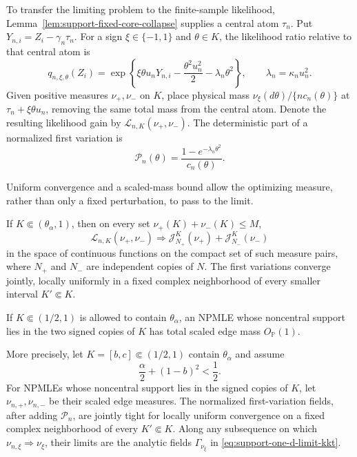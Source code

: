 To transfer the limiting problem to the finite-sample likelihood,
Lemma~\ref{lem:support-fixed-core-collapse} supplies a central atom
\(\tau_n\). Put \(Y_{n,i}=Z_i-\gamma_n\tau_n\). For a sign
\(\xi\in\{-1,1\}\) and \(\theta\in K\), the likelihood ratio relative to
that central atom is
\[
 q_{n,\xi,\theta}(Z_i)
 =\exp\left\{\xi\theta u_nY_{n,i}
       -\frac{\theta^2u_n^2}{2}-\lambda_n\theta^2\right\},
 \qquad \lambda_n=\kappa_nu_n^2.
\]
Given positive measures \(\nu_+,\nu_-\) on \(K\), place physical mass
\(\nu_\xi(d\theta)/\{nc_n(\theta)\}\) at
\(\tau_n+\xi\theta u_n\), removing the same total mass from the central atom.
Denote the resulting likelihood gain by
\(\mathcal L_{n,K}(\nu_+,\nu_-)\).
The deterministic part of a normalized first variation is
\begin{equation}
\label{eq:support-deterministic-penalty}
    \mathcal P_n(\theta)
    =\frac{1-e^{-\lambda_n\theta^2}}{c_n(\theta)}.
\end{equation}

Uniform convergence and a scaled-mass bound allow the optimizing measure,
rather than only a fixed perturbation, to pass to the limit.
\begin{proposition}
\label{prop:support-one-d-compact-likelihood}
If \(K\Subset(\theta_\alpha,1)\), then on every set
\(\nu_+(K)+\nu_-(K)\le M\),
\[
 \mathcal L_{n,K}(\nu_+,\nu_-)
 \Rightarrow
 \mathcal J_{N_+}^K(\nu_+)+\mathcal J_{N_-}^K(\nu_-)
\]
in the space of continuous functions on the compact set of such measure
pairs, where \(N_+\) and \(N_-\) are independent copies of \(N\). The first
variations converge jointly, locally uniformly in a fixed complex
neighborhood of every smaller interval \(K'\Subset K\).

If \(K\Subset(1/2,1)\) is allowed to contain \(\theta_\alpha\), an NPMLE
whose noncentral support lies in the two signed copies of \(K\) has total
scaled edge mass \(O_{\mathbb P}(1)\).

More precisely, let \(K=[b,c]\Subset(1/2,1)\) contain \(\theta_\alpha\) and
assume
\[
    \frac\alpha2+(1-b)^2<\frac12.
\]
For NPMLEs whose noncentral support lies in the signed copies of \(K\), let
\(\nu_{n,+},\nu_{n,-}\) be their scaled edge measures. The normalized
first-variation fields, after adding \(\mathcal P_n\), are jointly tight for
locally uniform convergence on a fixed complex neighborhood of every
\(K'\Subset K\). Along any subsequence on which
\(\nu_{n,\xi}\Rightarrow\nu_\xi\), their limits are the analytic fields
\(\Gamma_{\nu_\xi}\) in \eqref{eq:support-one-d-limit-kkt}.
\end{proposition}

